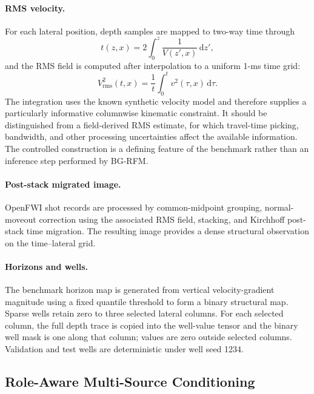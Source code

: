 \paragraph{RMS velocity.}
For each lateral position, depth samples are mapped to two-way time through
\begin{equation}
t(z,x)=2\int_0^z \frac{1}{V(z',x)}\,\mathrm{d}z',
\end{equation}
and the RMS field is computed after interpolation to a uniform 1-ms time grid:
\begin{equation}
V_{\mathrm{rms}}^2(t,x)=\frac{1}{t}\int_0^t v^2(\tau,x)\,\mathrm{d}\tau.
\end{equation}
The integration uses the known synthetic velocity model and therefore supplies a particularly informative columnwise kinematic constraint. It should be distinguished from a field-derived RMS estimate, for which travel-time picking, bandwidth, and other processing uncertainties affect the available information. The controlled construction is a defining feature of the benchmark rather than an inference step performed by BG-RFM.

\paragraph{Post-stack migrated image.}
OpenFWI shot records are processed by common-midpoint grouping, normal-moveout correction using the associated RMS field, stacking, and Kirchhoff post-stack time migration. The resulting image provides a dense structural observation on the time--lateral grid.

\paragraph{Horizons and wells.}
The benchmark horizon map is generated from vertical velocity-gradient magnitude using a fixed quantile threshold to form a binary structural map. Sparse wells retain zero to three selected lateral columns. For each selected column, the full depth trace is copied into the well-value tensor and the binary well mask is one along that column; values are zero outside selected columns. Validation and test wells are deterministic under well seed 1234.

\subsection{Role-Aware Multi-Source Conditioning}

